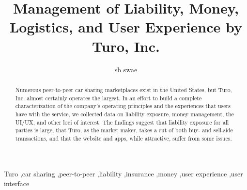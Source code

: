 \documentclass[review,12pt]{elsarticle}
\begin{document}
\begin{frontmatter}


\title{Management of Liability, Money, Logistics, and User Experience by Turo, Inc.}




\author{sb swae}

\address{\href{mailto:sb.swae@gmail.com}{sb.swae@gmail.com}; \url{https://swaevior.io}}

\begin{abstract}
Numerous peer-to-peer car sharing marketplaces exist in the United States, but Turo, Inc. almost certainly operates the largest. In an effort to build a complete characterization of the company's operating principles and the experiences that users have with the service, we collected data on liability exposure, money management, the UI/UX, and other loci of interest. The findings suggest that liability exposure for all parties is large, that Turo, as the market maker, takes a cut of both buy- and sell-side transactions, and that the website and apps, while attractive, suffer from some issues.
\end{abstract}

\begin{keyword}
Turo \sep car sharing \sep peer-to-peer \sep liability \sep insurance \sep money \sep user experience \sep user interface


\end{keyword}

\end{frontmatter}
\end{document}
